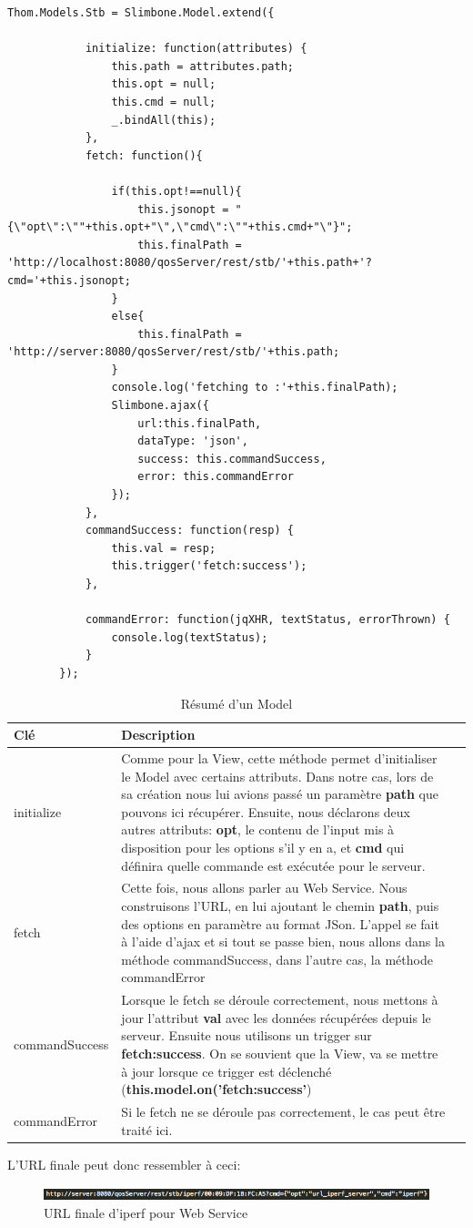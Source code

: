 \begin{lstlisting}[caption={Code du Model}]
		Thom.Models.Stb = Slimbone.Model.extend({
			
			initialize: function(attributes) {
      			this.path = attributes.path;
      			this.opt = null;
      			this.cmd = null;
      			_.bindAll(this);
    		},
			fetch: function(){

				if(this.opt!==null){
					this.jsonopt = "{\"opt\":\""+this.opt+"\",\"cmd\":\""+this.cmd+"\"}";
					this.finalPath = 'http://localhost:8080/qosServer/rest/stb/'+this.path+'?cmd='+this.jsonopt;
				}
				else{
					this.finalPath = 'http://server:8080/qosServer/rest/stb/'+this.path;
				}
				console.log('fetching to :'+this.finalPath);
				Slimbone.ajax({
					url:this.finalPath,
					dataType: 'json',
					success: this.commandSuccess,
					error: this.commandError
				});
			},
			commandSuccess: function(resp) {
				this.val = resp;
				this.trigger('fetch:success');
			},

			commandError: function(jqXHR, textStatus, errorThrown) {
   	 			console.log(textStatus);
  			}
		});
\end{lstlisting}
\begin{table}[H]
\begin{tabularx}{\textwidth}{|m{3cm}|X|l|}
  \hline
  \bf{Clé} & \bf{Description} \\
  \hline
  initialize & Comme pour la View, cette méthode permet d'initialiser le Model avec certains attributs. Dans notre cas, lors de sa création nous lui avions passé un paramètre \textbf{path} que pouvons ici récupérer. Ensuite, nous déclarons deux autres attributs: \textbf{opt}, le contenu de l'input mis à disposition pour les options s'il y en a, et \textbf{cmd} qui définira quelle commande est exécutée pour le serveur.\\
  \hline  
  fetch & Cette fois, nous allons parler au Web Service. Nous construisons l'URL, en lui ajoutant le chemin \textbf{path}, puis des options en paramètre au format JSon. L'appel se fait à l'aide d'ajax et si tout se passe bien, nous allons dans la méthode commandSuccess, dans l'autre cas, la méthode commandError\\
  \hline  
  commandSuccess & Lorsque le fetch se déroule correctement, nous mettons à jour l'attribut \textbf{val} avec les données récupérées depuis le serveur. Ensuite nous utilisons un trigger sur \textbf{fetch:success}. On se souvient que la View, va se mettre à jour lorsque ce trigger est déclenché (\textbf{this.model.on('fetch:success'})\\
  \hline  
  commandError & Si le fetch ne se déroule pas correctement, le cas peut être traité ici.
 \end{tabularx}
\caption{Résumé d'un Model}
\label{tab:classDiagram}
\end{table}

L'URL finale peut donc ressembler à ceci:
\begin{figure}[H]
      \centering
      \includegraphics[width=\textwidth]{00_media/url_iperf}
      \caption{URL finale d'iperf pour Web Service}
      \label{gra:maqmenu}
\end{figure}